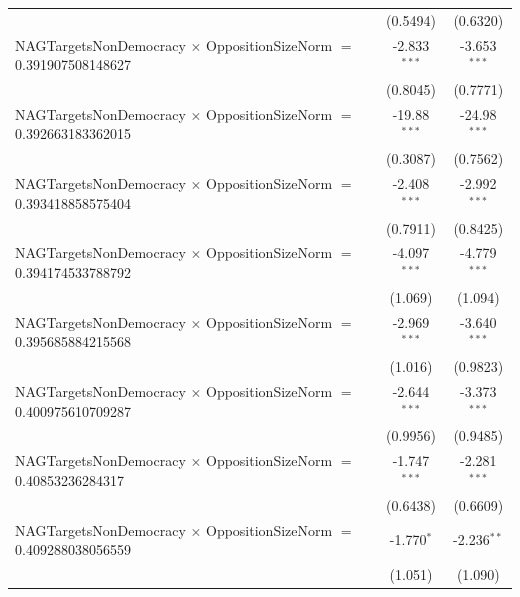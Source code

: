\begin{tabular}{lcc}
                                                                                & (0.5494)             & (0.6320)\\   
   NAGTargetsNonDemocracy $\times$ OppositionSizeNorm $=$ 0.391907508148627     & -2.833$^{***}$       & -3.653$^{***}$\\   
                                                                                & (0.8045)             & (0.7771)\\   
   NAGTargetsNonDemocracy $\times$ OppositionSizeNorm $=$ 0.392663183362015     & -19.88$^{***}$       & -24.98$^{***}$\\   
                                                                                & (0.3087)             & (0.7562)\\   
   NAGTargetsNonDemocracy $\times$ OppositionSizeNorm $=$ 0.393418858575404     & -2.408$^{***}$       & -2.992$^{***}$\\   
                                                                                & (0.7911)             & (0.8425)\\   
   NAGTargetsNonDemocracy $\times$ OppositionSizeNorm $=$ 0.394174533788792     & -4.097$^{***}$       & -4.779$^{***}$\\   
                                                                                & (1.069)              & (1.094)\\   
   NAGTargetsNonDemocracy $\times$ OppositionSizeNorm $=$ 0.395685884215568     & -2.969$^{***}$       & -3.640$^{***}$\\   
                                                                                & (1.016)              & (0.9823)\\   
   NAGTargetsNonDemocracy $\times$ OppositionSizeNorm $=$ 0.400975610709287     & -2.644$^{***}$       & -3.373$^{***}$\\   
                                                                                & (0.9956)             & (0.9485)\\   
   NAGTargetsNonDemocracy $\times$ OppositionSizeNorm $=$ 0.40853236284317      & -1.747$^{***}$       & -2.281$^{***}$\\   
                                                                                & (0.6438)             & (0.6609)\\   
   NAGTargetsNonDemocracy $\times$ OppositionSizeNorm $=$ 0.409288038056559     & -1.770$^{*}$         & -2.236$^{**}$\\   
                                                                                & (1.051)              & (1.090)\\   

\end{tabular}
